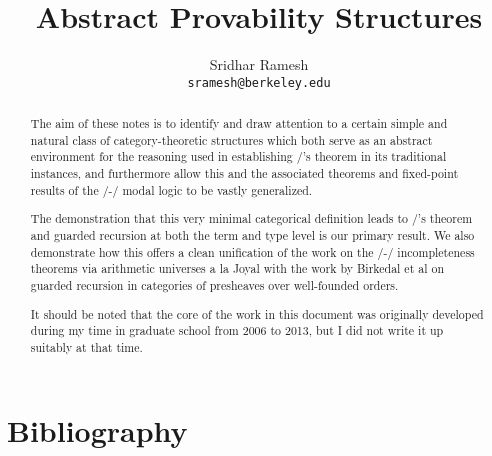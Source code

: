 \documentclass[12pt]{article}
\title{Abstract Provability Structures}
\author{
  Sridhar Ramesh\\
  \texttt{sramesh@berkeley.edu}
}
\begin{document}
\maketitle

\begin{abstract}

The aim of these notes is to identify and draw attention to a certain simple and natural class of category-theoretic structures which both serve as an abstract environment for the reasoning used in establishing \Loeb/'s theorem in its traditional instances, and furthermore allow this and the associated theorems and fixed-point results of the \Goedel/-\Loeb/ modal logic to be vastly generalized.

The demonstration that this very minimal categorical definition leads to \Loeb/'s theorem and guarded recursion at both the term and type level is our primary result. We also demonstrate how this offers a clean unification of the work on the \Godel/-\Lob/ incompleteness theorems via arithmetic universes a la Joyal with the work by Birkedal et al on guarded recursion in categories of presheaves over well-founded orders.

It should be noted that the core of the work in this document was originally developed during my time in graduate school from 2006 to 2013, but I did not write it up suitably at that time.
\end{abstract}

\newpage
{}
\setcounter{page}{1}
\tableofcontents

\setcounter{section}{-1}












\newpage \section{Bibliography}
\printbibliography

\printindex
\end{document}
